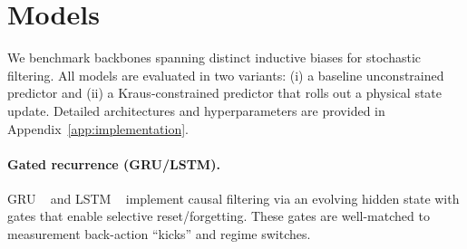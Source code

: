 \documentclass{article} %
\begin{document}



\section{Models}
We benchmark backbones spanning distinct inductive biases for stochastic filtering. All models are evaluated in two variants: (i) a baseline unconstrained predictor and (ii) a Kraus-constrained predictor that rolls out a physical state update. Detailed architectures and hyperparameters are provided in Appendix~\ref{app:implementation}.

\paragraph{Gated recurrence (GRU/LSTM).}
GRU ~\citep{cho2014gru} and LSTM ~\citep{hochreiter1997lstm} implement causal filtering via an evolving hidden state with gates that enable selective reset/forgetting. These gates are well-matched to measurement back-action ``kicks'' and regime switches\cite{ma2025mlreview}.
\end{document}
